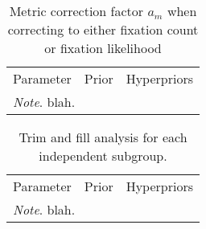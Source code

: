 \documentclass{article}
\begin{document}
\begin{table*}
\caption{Metric correction factor $a_m$ when correcting to either fixation count or fixation likelihood}
\label{tab:metric_correction}
\centering
\begin{tabularx}{\columnwidth}{p{}p{}p{}}
  \cmidrule(lr){1-3}
    \multicolumn{1}{l}{Parameter} &
    \multicolumn{1}{l}{Prior} &
    \multicolumn{1}{l}{Hyperpriors} \\
  \cmidrule(lr){1-3}

  \cmidrule(lr){1-3}

\multicolumn{3}{p{0.95\columnwidth}}{\textit{Note}. blah.}
\end{tabularx}
\end{table*}
\clearpage


\begin{table*}
\caption{Trim and fill analysis for each independent subgroup.}
\label{tab:trim_and_fill}
\centering
\begin{tabularx}{\columnwidth}{p{}p{}p{}}
  \cmidrule(lr){1-3}
    \multicolumn{1}{l}{Parameter} &
    \multicolumn{1}{l}{Prior} &
    \multicolumn{1}{l}{Hyperpriors} \\
  \cmidrule(lr){1-3}

  \cmidrule(lr){1-3}

\multicolumn{3}{p{0.95\columnwidth}}{\textit{Note}. blah.}
\end{tabularx}
\end{table*}
\clearpage
\end{document}
